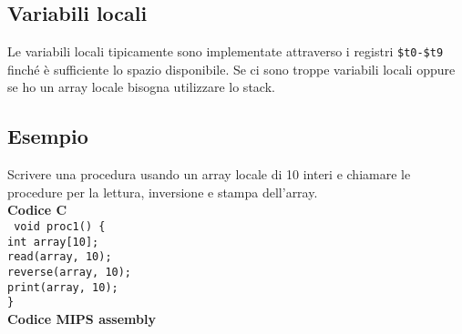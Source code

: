 \documentclass[../main.tex]{subfiles}
\begin{document}
\subsection{Variabili locali}
Le variabili locali tipicamente sono implementate attraverso i registri
\texttt{\$t0-\$t9} finché è sufficiente lo spazio disponibile.
Se ci sono troppe variabili locali oppure se ho un array locale
bisogna utilizzare lo stack.

\subsection*{Esempio}
Scrivere una procedura usando un array locale di 10 interi e chiamare
le procedure per la lettura, inversione e stampa dell'array. \\[5mm]
\textbf{Codice C} \\[2mm]
\texttt{
    void proc1() \{ \\
    \hspace*{0cm} \hspace*{0cm} \hspace*{0cm} \hspace*{0cm} int array[10]; \\
    \hspace*{0cm} \hspace*{0cm} \hspace*{0cm} \hspace*{0cm} read(array, 10); \\
    \hspace*{0cm} \hspace*{0cm} \hspace*{0cm} \hspace*{0cm} reverse(array, 10); \\
    \hspace*{0cm} \hspace*{0cm} \hspace*{0cm} \hspace*{0cm} print(array, 10); \\
    \} \\[5mm]
}
\textbf{Codice MIPS assembly}
\end{document}
